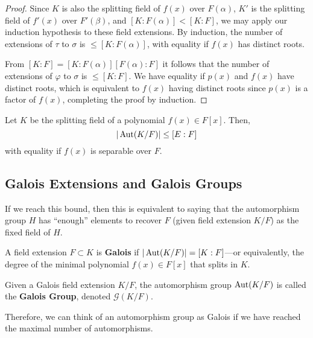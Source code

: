 \begin{proof}
    Since $K$ is also the splitting field of $f(x)$ over $F(\alpha)$, $K'$ is the splitting field of $f'(x)$ over $F'(\beta)$, and $[K : F(\alpha)] < [K : F]$, we may apply our induction hypothesis to these field extensions. By induction, the number of extensions of $\tau$ to $\sigma$ is $\leq [K : F(\alpha)]$, with equality if $f(x)$ has distinct roots.

    From $[K : F] = [K : F(\alpha)][F(\alpha) : F]$ it follows that the number of extensions of $\varphi$ to $\sigma$ is $\leq [K : F]$. We have equality if $p(x)$ and $f(x)$ have distinct roots, which is equivalent to $f(x)$ having distinct roots since $p(x)$ is a factor of $f(x)$, completing the proof by induction. 
  \end{proof}

  \begin{corollary}
    Let $K$ be the splitting field of a polynomial $f(x) \in F[x]$. Then, 
    \begin{equation}
      | \Aut(K/F) | \leq [E:F]
    \end{equation}
    with equality if $f(x)$ is separable over $F$. 
  \end{corollary}

\subsection{Galois Extensions and Galois Groups}

  If we reach this bound, then this is equivalent to saying that the automorphism group $H$ has ``enough'' elements to recover $F$ (given field extension $K/F$) as the fixed field of $H$. 

  \begin{definition}
    A field extension $F \subset K$ is \textbf{Galois} if $|\Aut(K/F)| = [K:F]$---or equivalently, the degree of the minimal polynomial $f(x) \in F[x]$ that splits in $K$. 
  \end{definition}

  \begin{definition}
    Given a Galois field extension $K/F$, the automorphism group $\Aut(K/F)$ is called the \textbf{Galois Group}, denoted $\mathcal{G}(K/F)$. 
  \end{definition}

  Therefore, we can think of an automorphism group as Galois if we have reached the maximal number of automorphisms. 

